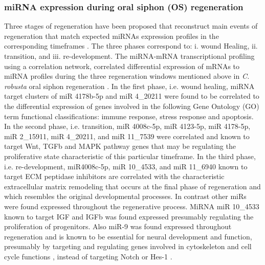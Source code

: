 \documentclass[graybox]{svmult}
\newcommand{\TODO}[1]{\begingroup\color{red}#1\endgroup}
\begin{document}
\subsubsection{miRNA expression during oral siphon (OS) regeneration}
Three stages of regeneration have been proposed that reconstruct main events of 
regeneration that match expected miRNAs expression profiles in the 
corresponding timeframes \cite{Knapp:2013}. The three phases correspond to: i. 
wound Healing, ii. transition, and iii. re-development. The miRNA-mRNA 
transcriptional profiling using a correlation network, correlated differential 
expression of mRNAs to miRNA profiles during the three regeneration windows 
mentioned above in \textit{C. robusta} oral siphon regeneration 
\cite{Spina:2017}. In the first phase, i.e. wound healing, miRNA target 
clusters of miR 4178b-5p and 
miR 4\_20211 were found to be correlated to the differential expression of 
genes involved in the following Gene Ontology (GO) term functional 
classifications: immune response, stress response and apoptosis. In the second 
phase, i.e. transition, 
miR 4008c-5p, miR 4123-5p, miR 4178-5p, miR 2\_15911, miR 4\_20211, and miR 
11\_7539 were correlated and known to target Wnt, TGFb and MAPK pathway genes 
that may be regulating the proliferative state characteristic of this particular 
timeframe. In the third phase, i.e. re-development, miR4008c-5p, miR 10\_4533, 
and miR 11\_6940 known to target ECM peptidase inhibitors are correlated with 
the characteristic extracellular matrix remodeling that occurs at the final 
phase of regeneration and which resembles the original developmental processes. 
In contrast other miRs were found expressed throughout the regenerative 
process. MiRNA miR 10\_4533 known to target IGF and IGFb was found expressed 
presumably regulating the proliferation of \TODO{progenitors}. Also miR-9 was 
found 
expressed throughout regeneration and is known to be essential for neural 
development and function, presumably by targeting and regulating genes involved 
in cytoskeleton and cell cycle functions \cite{Galderisi:2003rt, 
MCBEATH2004483}, instead of targeting Notch or Hes-1 \cite{Spina:2017}.
\end{document}
